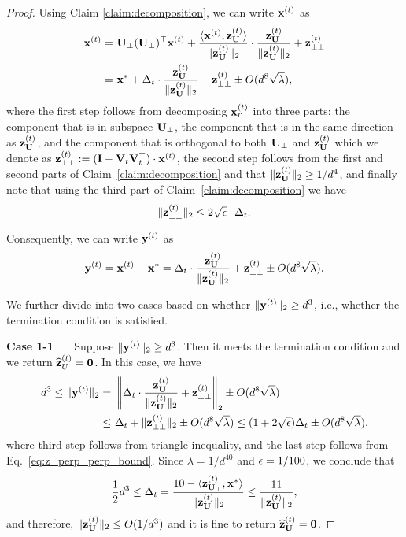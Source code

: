 \begin{proof}
Using Claim \ref{claim:decomposition}, we can write $\mathbf{x}^{(t)}$ as
\begin{align*}
\mathbf{x}^{(t)} = &~ \mathbf{U}_\perp (\mathbf{U}_\perp)^{\top} \mathbf{x}^{(t)} + \frac{\langle \mathbf{x}^{(t)}, \mathbf{z}^{(t)}_{\mathbf{U}} \rangle}{\|\mathbf{z}^{(t)}_{\mathbf{U}}\|_2} \cdot \frac{\mathbf{z}^{(t)}_{\mathbf{U}}}{\|\mathbf{z}_{\mathbf{U}}^{(t)}\|_2} + \mathbf{z}_{\perp\perp}^{(t)} \\
= &~ \mathbf{x}^{*} + \Delta_{t}\cdot  \frac{\mathbf{z}^{(t)}_{\mathbf{U}}}{\|\mathbf{z}_{\mathbf{U}}^{(t)}\|_2} + \mathbf{z}_{\perp\perp}^{(t)} \pm O(d^8\sqrt{\lambda}),
\end{align*}
where the first step follows from decomposing $\mathbf{x}_r^{(t)}$ into three parts: the component that is in subspace $\mathbf{U}_\perp$, the component that is in the same direction as $\mathbf{z}_{\mathbf{U}}^{(t)}$, and the component that is orthogonal to both $\mathbf{U}_\perp$ and $\mathbf{z}^{(t)}_{\mathbf{U}}$ which we denote as $\mathbf{z}_{\perp\perp}^{(t)} := (\mathbf{I} - \mathbf{V}_{t}\mathbf{V}_{t}^{\top}) \cdot \mathbf{x}^{(t)}$, the second step follows from the first and second parts of Claim~\ref{claim:decomposition} and that $\|\mathbf{z}_{\mathbf{U}}^{(t)}\|_2 \geq 1/d^4$, and finally note that using the third part of Claim~\ref{claim:decomposition} we have 
\begin{equation}\label{eq:z_perp_perp_bound}
\|\mathbf{z}_{\perp\perp}^{(t)}\|_2 \leq 2\sqrt{\epsilon}\cdot \Delta_{t}.
\end{equation}


Consequently, we can write $\mathbf{y}^{(t)}$ as
\begin{align}\label{eq:y_rt}
    \mathbf{y}^{(t)} = \mathbf{x}^{(t)} - \mathbf{x}^* = \Delta_{t}\cdot  \frac{\mathbf{z}^{(t)}_{\mathbf{U}}}{\|\mathbf{z}_{\mathbf{U}}^{(t)}\|_2} + \mathbf{z}_{\perp\perp}^{(t)} \pm O(d^8\sqrt{\lambda}).
\end{align}

We further divide into two cases based on whether $\|\mathbf{y}^{(t)}\|_2 \geq d^3$, i.e., whether the termination condition is satisfied.

\vspace{+2mm}
{\bf \noindent Case 1-1 \ \ } Suppose $\|\mathbf{y}^{(t)}\|_2 \geq d^3$. Then it meets the termination condition and we return $\widehat{\mathbf{z}}_{U}^{(t)} = \mathbf{0}$. 
In this case, we have
\begin{align*}
d^3 \leq \|\mathbf{y}^{(t)}\|_2 = &~ \left\|\Delta_{t}\cdot  \frac{\mathbf{z}^{(t)}_{\mathbf{U}}}{\|\mathbf{z}_{ \mathbf{U}}^{(t)}\|_2} + \mathbf{z}_{\perp\perp}^{(t)}\right\|_2  \pm O(d^8\sqrt{\lambda} ) \\
\leq &~\Delta_{t} + \|\mathbf{z}_{\perp\perp}^{(t)}\|_2 \pm O(d^8\sqrt{\lambda} ) \leq (1+2\sqrt{\epsilon})\Delta_{t}  \pm O(d^8\sqrt{\lambda} ),
\end{align*}
where third step follows from triangle inequality, and the last step follows from Eq.~\eqref{eq:z_perp_perp_bound}. 
Since $\lambda = 1/d^{40}$ and $\epsilon = 1/100$, we conclude that
\begin{align*}
\frac{1}{2}d^3 \leq \Delta_{t} =  \frac{10 - \langle \mathbf{z}_{\mathbf{U}_\perp}^{(t)},\mathbf{x}^{*}\rangle}{\|\mathbf{z}_{ \mathbf{U}}^{(t)}\|_2}
\leq \frac{11}{\|\mathbf{z}_{\mathbf{U}}^{(t)}\|_2},
\end{align*}
and therefore, $\|\mathbf{z}_{\mathbf{U}}^{(t)}\|_2 \leq O(1/d^3)$ and it is fine to return $\widehat{\mathbf{z}}_{\mathbf{U}}^{(t)} = \mathbf{0}$.



\end{proof}
